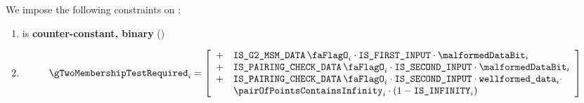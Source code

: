 \noindent
We impose the following constraints on \gTwoMembershipTestRequired{}:
\begin{enumerate}
    \item \gTwoMembershipTestRequired{} is \textbf{counter-constant, binary} \quad (\trash)
    \item 
        \[
            \gTwoMembershipTestRequired_{i} = 
                \left[ \begin{array}{cl} 
                    + & \isBlsGTwoMsmData_{i} \cdot \isFirstInput \cdot \malformedDataBit_{i}  \\
                    + & \isBlsPairingCheckData_{i} \cdot \isSecondInput \cdot \malformedDataBit_{i} \\
                    + & \isBlsPairingCheckData_{i} \cdot \isSecondInput \cdot \locWellformedData_{i} \cdot \\
                    & \pairOfPointsContainsInfinity_{i} \cdot (1 - \isInfinity_{i}) \\
                \end{array} \right] \\
        \]
\end{enumerate}


